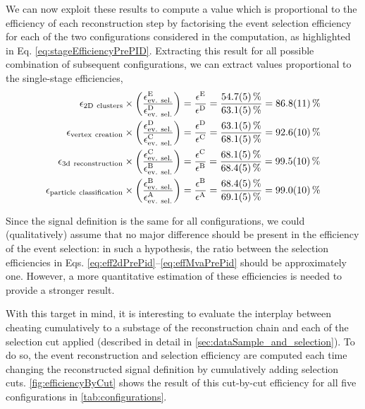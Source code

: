 We can now exploit these results to compute a value which is proportional to the efficiency of each reconstruction step by factorising the event selection efficiency for each of the two configurations considered in the computation, as highlighted in Eq. \eqref{eq:stageEfficiencyPrePID}. Extracting this result for all possible combination of subsequent configurations, we can extract values proportional to the single-stage efficiencies, \begin{align}
    \epsilon_\mathrm{2D\ clusters} \times 
    \qty(\frac{\epsilon_\mathrm{ev.\ sel.}^\mathrm{E}}{\epsilon_\mathrm{ev.\ sel.}^\mathrm{D}}) 
    &= \frac{\epsilon^\mathrm{E}}{\epsilon^\mathrm{D}} = \frac{\SI{54.7(5)}{\percent}}{\SI{63.1(5)}{\percent}} = 
    \SI[round-mode = uncertainty]{86.779059+-1.104354}{\percent} \label{eq:eff2dPrePid}\\
    \epsilon_\mathrm{vertex\ creation} 
    \times \qty(\frac{\epsilon_\mathrm{ev.\ sel.}^\mathrm{D}}{\epsilon_\mathrm{ev.\ sel.}^\mathrm{C}}) 
    &= \frac{\epsilon^\mathrm{D}}{\epsilon^\mathrm{C}} = \frac{\SI{63.1(5)}{\percent}}{\SI{68.1(5)}{\percent}} = 
    \SI[round-mode = uncertainty]{92.575370+-1.024352}{\percent} \\
    \epsilon_\mathrm{3d\ reconstruction} 
    \times \qty(\frac{\epsilon_\mathrm{ev.\ sel.}^\mathrm{C}}{\epsilon_\mathrm{ev.\ sel.}^\mathrm{B}}) 
    &= \frac{\epsilon^\mathrm{C}}{\epsilon^\mathrm{B}} = \frac{\SI{68.1(5)}{\percent}}{\SI{68.4(5)}{\percent}} = 
    \SI[round-mode = uncertainty]{99.526687+-1.041368}{\percent} \\
    \epsilon_\mathrm{particle\ classification} 
    \times \qty(\frac{\epsilon_\mathrm{ev.\ sel.}^\mathrm{B}}{\epsilon_\mathrm{ev.\ sel.}^\mathrm{A}}) 
    &= \frac{\epsilon^\mathrm{B}}{\epsilon^\mathrm{A}} = \frac{\SI{68.4(5)}{\percent}}{\SI{69.1(5)}{\percent}} = 
    \SI[round-mode = uncertainty]{99.039894+-1.024644}{\percent} \label{eq:effMvaPrePid}
\end{align}

Since the signal definition is the same for all configurations, we could (qualitatively) assume that no major difference should be present in the efficiency of the event selection: in such a hypothesis, the ratio between the selection efficiencies in Eqs. \eqref{eq:eff2dPrePid}--\eqref{eq:effMvaPrePid} should be approximately one.
However, a more quantitative estimation of these efficiencies is needed to provide a stronger result. 

With this target in mind, it is interesting to evaluate the interplay between cheating cumulatively to a substage of the reconstruction chain and each of the selection cut applied (described in detail in \autoref{sec:dataSample_and_selection}). To do so, the event reconstruction and selection efficiency are computed each time changing the reconstructed signal definition by cumulatively adding selection cuts. \autoref{fig:efficiencyByCut} shows the result of this cut-by-cut efficiency for all five configurations in \autoref{tab:configurations}. 

